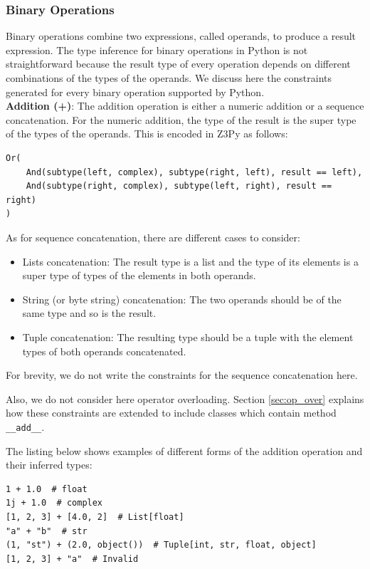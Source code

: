 \subsubsection{Binary Operations}
Binary operations combine two expressions, called operands, to produce a result expression. The type inference for binary operations in Python is not straightforward because the result type of every operation depends on different combinations of the types of the operands. We discuss here the constraints generated for every binary operation supported by Python.\\

\textbf{Addition (+)}:
The addition operation is either a numeric addition or a sequence concatenation. For the numeric addition, the type of the result is the super type of the types of the operands. This is encoded in Z3Py as follows:

\begin{lstlisting}
Or(
	And(subtype(left, complex), subtype(right, left), result == left),
	And(subtype(right, complex), subtype(left, right), result == right)
)
\end{lstlisting}

As for sequence concatenation, there are different cases to consider:

\begin{itemize}
	\item Lists concatenation: The result type is a list and the type of its elements is a super type of types of the elements in both operands.
	\item String (or byte string) concatenation: The two operands should be of the same type and so is the result.
	\item Tuple concatenation: The resulting type should be a tuple with the element types of both operands concatenated.
\end{itemize}

For brevity, we do not write the constraints for the sequence concatenation here.

Also, we do not consider here operator overloading. Section \ref{sec:op_over} explains how these constraints are extended to include classes which contain method \lstinline|__add__|.

The listing below shows examples of different forms of the addition operation and their inferred types:

\begin{lstlisting}
1 + 1.0  # float
1j + 1.0  # complex
[1, 2, 3] + [4.0, 2]  # List[float]
"a" + "b"  # str
(1, "st") + (2.0, object())  # Tuple[int, str, float, object]
[1, 2, 3] + "a"  # Invalid
\end{lstlisting}


